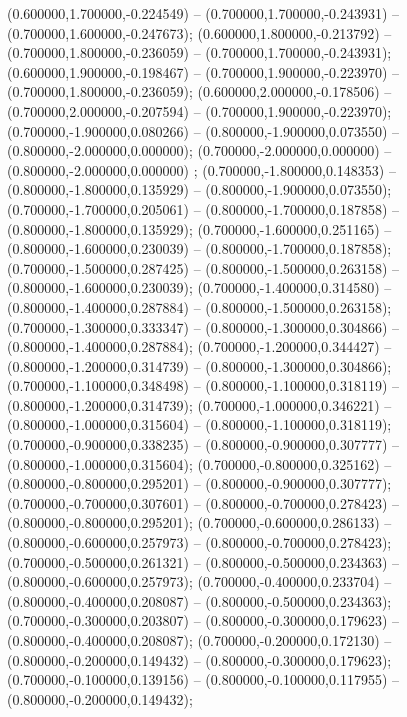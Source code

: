  (0.600000,1.700000,-0.224549) -- (0.700000,1.700000,-0.243931) -- (0.700000,1.600000,-0.247673);
 (0.600000,1.800000,-0.213792) -- (0.700000,1.800000,-0.236059) -- (0.700000,1.700000,-0.243931);
 (0.600000,1.900000,-0.198467) -- (0.700000,1.900000,-0.223970) -- (0.700000,1.800000,-0.236059);
 (0.600000,2.000000,-0.178506) -- (0.700000,2.000000,-0.207594) -- (0.700000,1.900000,-0.223970);
 (0.700000,-1.900000,0.080266) -- (0.800000,-1.900000,0.073550) -- (0.800000,-2.000000,0.000000);
 (0.700000,-2.000000,0.000000) -- (0.800000,-2.000000,0.000000) ;
 (0.700000,-1.800000,0.148353) -- (0.800000,-1.800000,0.135929) -- (0.800000,-1.900000,0.073550);
 (0.700000,-1.700000,0.205061) -- (0.800000,-1.700000,0.187858) -- (0.800000,-1.800000,0.135929);
 (0.700000,-1.600000,0.251165) -- (0.800000,-1.600000,0.230039) -- (0.800000,-1.700000,0.187858);
 (0.700000,-1.500000,0.287425) -- (0.800000,-1.500000,0.263158) -- (0.800000,-1.600000,0.230039);
 (0.700000,-1.400000,0.314580) -- (0.800000,-1.400000,0.287884) -- (0.800000,-1.500000,0.263158);
 (0.700000,-1.300000,0.333347) -- (0.800000,-1.300000,0.304866) -- (0.800000,-1.400000,0.287884);
 (0.700000,-1.200000,0.344427) -- (0.800000,-1.200000,0.314739) -- (0.800000,-1.300000,0.304866);
 (0.700000,-1.100000,0.348498) -- (0.800000,-1.100000,0.318119) -- (0.800000,-1.200000,0.314739);
 (0.700000,-1.000000,0.346221) -- (0.800000,-1.000000,0.315604) -- (0.800000,-1.100000,0.318119);
 (0.700000,-0.900000,0.338235) -- (0.800000,-0.900000,0.307777) -- (0.800000,-1.000000,0.315604);
 (0.700000,-0.800000,0.325162) -- (0.800000,-0.800000,0.295201) -- (0.800000,-0.900000,0.307777);
 (0.700000,-0.700000,0.307601) -- (0.800000,-0.700000,0.278423) -- (0.800000,-0.800000,0.295201);
 (0.700000,-0.600000,0.286133) -- (0.800000,-0.600000,0.257973) -- (0.800000,-0.700000,0.278423);
 (0.700000,-0.500000,0.261321) -- (0.800000,-0.500000,0.234363) -- (0.800000,-0.600000,0.257973);
 (0.700000,-0.400000,0.233704) -- (0.800000,-0.400000,0.208087) -- (0.800000,-0.500000,0.234363);
 (0.700000,-0.300000,0.203807) -- (0.800000,-0.300000,0.179623) -- (0.800000,-0.400000,0.208087);
 (0.700000,-0.200000,0.172130) -- (0.800000,-0.200000,0.149432) -- (0.800000,-0.300000,0.179623);
 (0.700000,-0.100000,0.139156) -- (0.800000,-0.100000,0.117955) -- (0.800000,-0.200000,0.149432);

